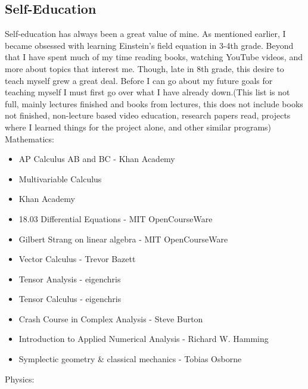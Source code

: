 \subsection{Self-Education}
\par Self-education has always been a great value of mine. As mentioned earlier, I became obsessed with learning Einstein's field equation in 3-4th grade. Beyond that I have spent much of my time reading books, watching YouTube videos, and more about topics that interest me. Though, late in 8th grade, this desire to teach myself grew a great deal. Before I can go about my future goals for teaching myself I must first go over what I have already down.(This list is not full, mainly lectures finished and books from lectures, this does not include books not finished, non-lecture based video education, research papers read, projects where I learned things for the project alone, and other similar programs)
\\
Mathematics:
\begin{itemize}
    \item AP Calculus AB and BC - Khan Academy
    \item Multivariable Calculus 
    \item Khan Academy
    \item 18.03 Differential Equations - MIT OpenCourseWare
    \item Gilbert Strang on linear algebra - MIT OpenCourseWare
    \item Vector Calculus - Trevor Bazett
    \item Tensor Analysis - eigenchris
    \item Tensor Calculus - eigenchris
    \item Crash Course in Complex Analysis - Steve Burton 
    \item Introduction to Applied Numerical Analysis - Richard W. Hamming
    \item Symplectic geometry \& classical mechanics - Tobias Osborne 
\end{itemize}
Physics:
